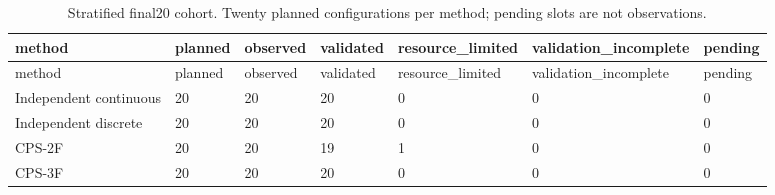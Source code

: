 \begingroup
\small
\begin{longtable}{lllllll}
\caption{Stratified final20 cohort. Twenty planned configurations per method; pending slots are not observations.}\label{tab:final20-completion}\\
\toprule
method & planned & observed & validated & resource\_limited & validation\_incomplete & pending \\
\midrule
\endfirsthead
\toprule
method & planned & observed & validated & resource\_limited & validation\_incomplete & pending \\
\midrule
\endhead
Independent continuous & 20 & 20 & 20 & 0 & 0 & 0 \\
Independent discrete & 20 & 20 & 20 & 0 & 0 & 0 \\
CPS-2F & 20 & 20 & 19 & 1 & 0 & 0 \\
CPS-3F & 20 & 20 & 20 & 0 & 0 & 0 \\
\bottomrule
\end{longtable}
\endgroup
